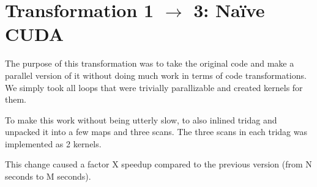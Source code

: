 \section{Transformation 1 $\rightarrow$ 3: Naïve CUDA}

The purpose of this transformation was to take the original code and
make a parallel version of it without doing much work in terms of code
transformations. We simply took all loops that were trivially
parallizable and created kernels for them.

To make this work without being utterly slow, to also inlined tridag
and unpacked it into a few maps and three scans. The three scans in
each tridag was implemented as 2 kernels.

This change caused a factor X speedup compared to the previous version
(from N seconds to M seconds).
